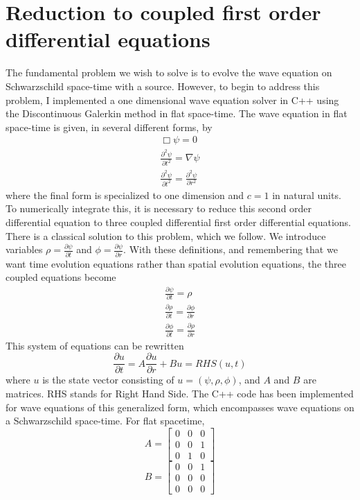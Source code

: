 \section{Reduction to coupled first order differential equations}


The fundamental problem we wish to solve is to evolve the wave equation on Schwarzschild space-time with a source. However, to begin to address this problem, I implemented a one dimensional wave equation solver in C++ using the Discontinuous Galerkin method in flat space-time. The wave equation in flat space-time is given, in several different forms, by
\begin{eqnarray}
  \Box\psi=0\\
  \frac{\partial^2\psi}{\partial t^2}=\nabla\psi\\
  \frac{\partial^2\psi}{\partial t^2}=\frac{\partial^2 \psi}{\partial r^2}
\end{eqnarray}
where the final form is specialized to one dimension and $c=1$ in natural units. To numerically integrate this, it is necessary to reduce this second order differential equation to three coupled differential first order differential equations. There is a classical solution to this problem, which we follow. We introduce variables $\rho=\frac{\partial \psi}{\partial t}$ and $\phi = \frac{\partial\psi}{\partial r}$. With these definitions, and remembering that we want time evolution equations rather than spatial evolution equations, the three coupled equations become
\begin{eqnarray}
  \frac{\partial\psi}{\partial t} = \rho\nonumber\\
  \frac{\partial\rho}{\partial t} = \frac{\partial \phi}{\partial r}\nonumber\\
  \frac{\partial\phi}{\partial t} = \frac{\partial \rho}{\partial r}
  \label{stateev}
\end{eqnarray}
This system of equations can be rewritten
\begin{equation}
  \frac{\partial u}{\partial t} = A\frac{\partial u}{\partial r} + Bu\nonumber = RHS(u,t)
  \label{matrixdiff}
\end{equation}
where $u$ is the state vector consisting of $u=(\psi,\rho,\phi)$, and $A$ and $B$ are matrices. RHS stands for Right Hand Side. The C++ code has been implemented for wave equations of this generalized form, which encompasses wave equations on a Schwarzschild space-time. For flat spacetime,
\[
A=
\begin{bmatrix}
  0 & 0 & 0\\
  0 & 0 & 1\\
  0 & 1 & 0
\end{bmatrix}
\]
\[B=
\begin{bmatrix}
  0 & 0 & 1\\
  0 & 0 & 0\\
  0 & 0 & 0
\end{bmatrix}
\]




